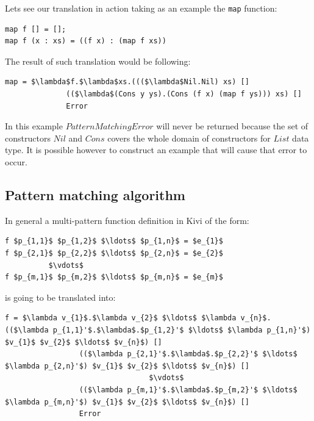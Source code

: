 \documentclass[12pt,a4paper]{report}
\begin{document}
Lets see our translation in action taking as an example the \texttt{map}
function:

\vspace*{0.2in}
\begin{lstlisting}[style=haskell]
map f [] = [];
map f (x : xs) = ((f x) : (map f xs))
\end{lstlisting}
The result of such translation would be following:

\vspace*{0.2in}
\begin{lstlisting}[style=haskell,mathescape=true]
map = $\lambda$f.$\lambda$xs.((($\lambda$Nil.Nil) xs) []
              (($\lambda$(Cons y ys).(Cons (f x) (map f ys))) xs) []
              Error
\end{lstlisting}
In this example $PatternMatchingError$ will never be returned because the set
of constructors $Nil$ and $Cons$ covers the whole domain of constructors for
$List$ data type. It is possible however to construct an example that will cause
that error to occur.

\subsection{Pattern matching algorithm}
\label{sec:pattern_matching_algorithm}

In general a multi-pattern function definition in Kivi of the form:

\vspace*{0.2in}
\begin{lstlisting}[style=haskell,mathescape=true]
f $p_{1,1}$ $p_{1,2}$ $\ldots$ $p_{1,n}$ = $e_{1}$
f $p_{2,1}$ $p_{2,2}$ $\ldots$ $p_{2,n}$ = $e_{2}$
          $\vdots$
f $p_{m,1}$ $p_{m,2}$ $\ldots$ $p_{m,n}$ = $e_{m}$
\end{lstlisting}
is going to be translated into:

\vspace*{0.2in}
\begin{lstlisting}[style=haskell,mathescape=true]
f = $\lambda v_{1}$.$\lambda v_{2}$ $\ldots$ $\lambda v_{n}$.(($\lambda p_{1,1}'$.$\lambda$.$p_{1,2}'$ $\ldots$ $\lambda p_{1,n}'$) $v_{1}$ $v_{2}$ $\ldots$ $v_{n}$) []
                 (($\lambda p_{2,1}'$.$\lambda$.$p_{2,2}'$ $\ldots$ $\lambda p_{2,n}'$) $v_{1}$ $v_{2}$ $\ldots$ $v_{n}$) []
                                 $\vdots$
                 (($\lambda p_{m,1}'$.$\lambda$.$p_{m,2}'$ $\ldots$ $\lambda p_{m,n}'$) $v_{1}$ $v_{2}$ $\ldots$ $v_{n}$) []
                 Error
\end{lstlisting}
\end{document}
